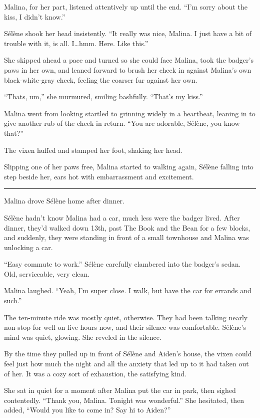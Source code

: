 Malina, for her part, listened attentively up until the end. ``I'm sorry about the kiss, I didn't know.''

Sélène shook her head insistently. ``It really was nice, Malina. I just have a bit of trouble with it, is all. I\ldots{}hmm. Here. Like this.''

She skipped ahead a pace and turned so she could face Malina, took the badger's paws in her own, and leaned forward to brush her cheek in against Malina's own black-white-gray cheek, feeling the coarser fur against her own.

``Thats, um,'' she murmured, smiling bashfully. ``That's my kiss.''

Malina went from looking startled to grinning widely in a heartbeat, leaning in to give another rub of the cheek in return. ``You are adorable, Sélène, you know that?''

The vixen huffed and stamped her foot, shaking her head.

Slipping one of her paws free, Malina started to walking again, Sélène falling into step beside her, ears hot with embarrassment and excitement.

\begin{center}\rule{0.5\linewidth}{\linethickness}\end{center}

Malina drove Sélène home after dinner.

Sélène hadn't know Malina had a car, much less were the badger lived. After dinner, they'd walked down 13th, past The Book and the Bean for a few blocks, and suddenly, they were standing in front of a small townhouse and Malina was unlocking a car.

``Easy commute to work.'' Sélène carefully clambered into the badger's sedan. Old, serviceable, very clean.

Malina laughed. ``Yeah, I'm super close. I walk, but have the car for errands and such.''

The ten-minute ride was mostly quiet, otherwise. They had been talking nearly non-stop for well on five hours now, and their silence was comfortable. Sélène's mind was quiet, glowing. She reveled in the silence.

By the time they pulled up in front of Sélène and Aiden's house, the vixen could feel just how much the night and all the anxiety that led up to it had taken out of her. It was a cozy sort of exhaustion, the satisfying kind.

She sat in quiet for a moment after Malina put the car in park, then sighed contentedly. ``Thank you, Malina. Tonight was wonderful.'' She hesitated, then added, ``Would you like to come in? Say hi to Aiden?''

